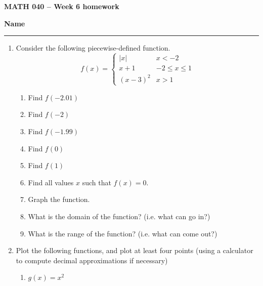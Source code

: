 \documentclass[12 pt]{article}
\begin{document}
  \begin{center}
    \textbf{\hfill MATH 040 -- Week 6 homework} \\
  \end{center}
  \medskip

  \noindent
  \textbf{Name}\ \rule{3.5in}{.4pt} \hfill
  \vspace{.1in}
  \hspace*{0.2in}

	\medskip
  \noindent

  \begin{enumerate}
    \item Consider the following piecewise-defined function. \[
      f(x) = \begin{cases}
        |x| & x < -2 \\
        x + 1 & -2 \leq x \leq 1 \\
        (x - 3)^2 & x > 1
      \end{cases}
    \]
    \begin{enumerate}
      \item Find $f(-2.01)$
      \item Find $f(-2)$
      \item Find $f(-1.99)$
      \item Find $f(0)$
      \item Find $f(1)$
      \item Find all values $x$ such that $f(x) = 0$.
      \item Graph the function.\\
      \item What is the domain of the function? (i.e. what can go in?)
      \item What is the range of the function? (i.e. what can come out?)
    \end{enumerate}
		\pagebreak
		\item Plot the following functions, and plot at least four points
    (using a calculator to compute decimal approximations if necessary)
    \begin{enumerate}
      \item $g(x) = x^2$ \\
      \begin{tikzpicture}[scale = 1.2]

\end{tikzpicture}
\end{enumerate}
\end{enumerate}
\end{document}

